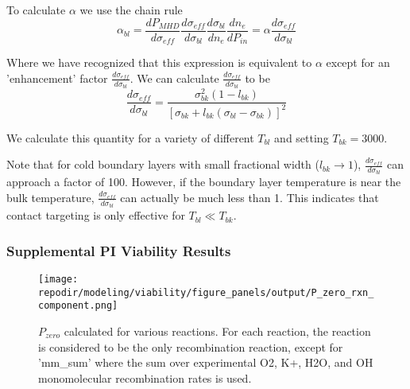 To calculate $\alpha$ we use the chain rule
\[
\alpha_{bl}=\frac{dP_{MHD}}{d\sigma_{eff}} \frac{d\sigma_{eff}}{d\sigma_{bl}} \frac{d\sigma_{bl}}{dn_e} \frac{dn_e}{dP_{in}}=\alpha \frac{d\sigma_{eff}}{d\sigma_{bl}} \tag{13}
\]

Where we have recognized that this expression is equivalent to $\alpha$ except for an 'enhancement' factor $\frac{d\sigma_{eff}}{d\sigma_{bl}}$. We can calculate $\frac{d\sigma_{eff}}{d\sigma_{bl}}$ to be
\[
\frac{d\sigma_{eff}}{d\sigma_{bl}}=\frac{\sigma_{bk}^2 (1-l_{bk})}{[\sigma_{bk}+l_{bk} (\sigma_{bl}-\sigma_{bk})]^2} \tag{14}
\]

We calculate this quantity for a variety of different $T_{bl}$ and setting $T_{bk} = 3000$.

Note that for cold boundary layers with small fractional width ($l_{bk}\rightarrow1$), $\frac{d\sigma_{eff}}{d\sigma_{bl}}$ can approach a factor of 100. However, if the boundary layer temperature is near the bulk temperature, $\frac{d\sigma_{eff}}{d\sigma_{bl}}$ can actually be much less than 1. This indicates that contact targeting is only effective for $T_{bl} \ll T_{bk}$.


\clearpage

\subsubsection{Supplemental PI Viability Results}

\begin{figure}[h]
    \centering
    \texttt{[image: \\repodir/modeling/viability/figure\_panels/output/P\_zero\_rxn\_component.png]} 
    \caption{$P_{zero}$ calculated for various reactions. For each reaction, the reaction is considered to be the only recombination reaction, except for 'mm\_sum' where the sum over experimental O2, K+, H2O, and OH monomolecular recombination rates is used.}
    \label{fig:SI_P_zero_rxn_component}
\end{figure}




